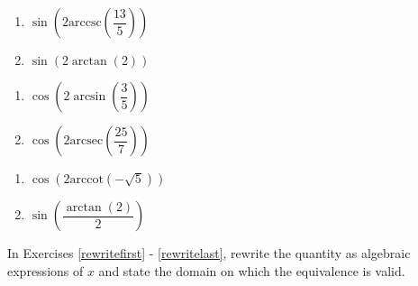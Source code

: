 \begin{multicols}{2}

\begin{enumerate}

\setcounter{enumi}{\value{HW}}

\item  $\sin\left(2\text{arccsc}\left(\dfrac{13}{5}\right)\right)$
\item  $\sin\left(2\arctan\left(2\right)\right)$ 

\setcounter{HW}{\value{enumi}}

\end{enumerate}

\end{multicols}

\begin{multicols}{2}

\begin{enumerate}

\setcounter{enumi}{\value{HW}}

\item  $\cos\left(2 \arcsin\left(\dfrac{3}{5}\right)\right)$
\item  $\cos\left(2 \text{arcsec}\left(\dfrac{25}{7}\right)\right)$

\setcounter{HW}{\value{enumi}}

\end{enumerate}

\end{multicols}

\begin{multicols}{2}

\begin{enumerate}

\setcounter{enumi}{\value{HW}}

\item  $\cos\left(2 \text{arccot}\left(-\sqrt{5}\right)\right)$ 
\item  $\sin\left( \dfrac{\arctan(2)}{2} \right)$ \label{exactvalueidenlast}

\setcounter{HW}{\value{enumi}}

\end{enumerate}

\end{multicols}

\pagebreak

In Exercises \ref{rewritefirst} - \ref{rewritelast}, rewrite the quantity as algebraic expressions of $x$ and state the domain on which the equivalence is valid.

